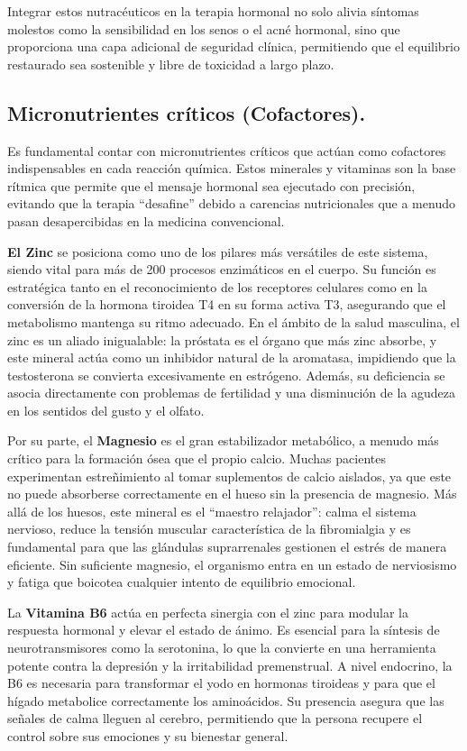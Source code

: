 \documentclass[
  spanish,
]{article}
\begin{document}
Integrar estos nutracéuticos en la terapia hormonal no solo alivia síntomas molestos como la sensibilidad en los senos o el acné hormonal, sino que proporciona una capa adicional de seguridad clínica, permitiendo que el equilibrio restaurado sea sostenible y libre de toxicidad a largo plazo.

\subsection{Micronutrientes críticos (Cofactores).}\label{micronutrientes-cruxedticos-cofactores.}

Es fundamental contar con micronutrientes críticos que actúan como cofactores indispensables en cada reacción química. Estos minerales y vitaminas son la base rítmica que permite que el mensaje hormonal sea ejecutado con precisión, evitando que la terapia ``desafine'' debido a carencias nutricionales que a menudo pasan desapercibidas en la medicina convencional.

\textbf{El Zinc} se posiciona como uno de los pilares más versátiles de este sistema, siendo vital para más de 200 procesos enzimáticos en el cuerpo. Su función es estratégica tanto en el reconocimiento de los receptores celulares como en la conversión de la hormona tiroidea T4 en su forma activa T3, asegurando que el metabolismo mantenga su ritmo adecuado. En el ámbito de la salud masculina, el zinc es un aliado inigualable: la próstata es el órgano que más zinc absorbe, y este mineral actúa como un inhibidor natural de la aromatasa, impidiendo que la testosterona se convierta excesivamente en estrógeno. Además, su deficiencia se asocia directamente con problemas de fertilidad y una disminución de la agudeza en los sentidos del gusto y el olfato.

Por su parte, el \textbf{Magnesio} es el gran estabilizador metabólico, a menudo más crítico para la formación ósea que el propio calcio. Muchas pacientes experimentan estreñimiento al tomar suplementos de calcio aislados, ya que este no puede absorberse correctamente en el hueso sin la presencia de magnesio. Más allá de los huesos, este mineral es el ``maestro relajador'': calma el sistema nervioso, reduce la tensión muscular característica de la fibromialgia y es fundamental para que las glándulas suprarrenales gestionen el estrés de manera eficiente. Sin suficiente magnesio, el organismo entra en un estado de nerviosismo y fatiga que boicotea cualquier intento de equilibrio emocional.

La \textbf{Vitamina B6} actúa en perfecta sinergia con el zinc para modular la respuesta hormonal y elevar el estado de ánimo. Es esencial para la síntesis de neurotransmisores como la serotonina, lo que la convierte en una herramienta potente contra la depresión y la irritabilidad premenstrual. A nivel endocrino, la B6 es necesaria para transformar el yodo en hormonas tiroideas y para que el hígado metabolice correctamente los aminoácidos. Su presencia asegura que las señales de calma lleguen al cerebro, permitiendo que la persona recupere el control sobre sus emociones y su bienestar general.
\end{document}
